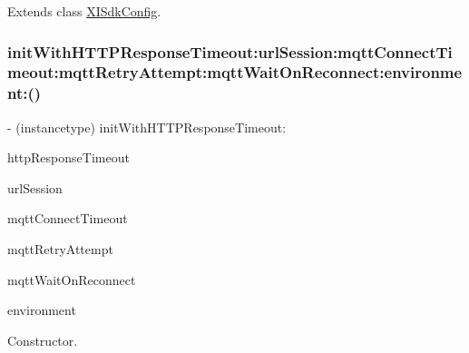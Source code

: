 Extends class \hyperlink{class_x_i_sdk_config_aaf78fa6769fee2f17ba641609f112e55}{X\+I\+Sdk\+Config}.

\hypertarget{category_x_i_sdk_config_07_selector_08_aeceeeb80a520f874d9793485a70bd591}{}\label{category_x_i_sdk_config_07_selector_08_aeceeeb80a520f874d9793485a70bd591} 
\subsubsection{\texorpdfstring{init\+With\+H\+T\+T\+P\+Response\+Timeout\+:url\+Session\+:mqtt\+Connect\+Timeout\+:mqtt\+Retry\+Attempt\+:mqtt\+Wait\+On\+Reconnect\+:environment\+:()}{initWithHTTPResponseTimeout:urlSession:mqttConnectTimeout:mqttRetryAttempt:mqttWaitOnReconnect:environment:()}}
{\footnotesize\ttfamily -\/ (instancetype) init\+With\+H\+T\+T\+P\+Response\+Timeout\+: \begin{DoxyParamCaption}\item[{(long)}]{http\+Response\+Timeout }\item[{urlSession:(N\+S\+U\+R\+L\+Session $\ast$)}]{url\+Session }\item[{mqttConnectTimeout:(long)}]{mqtt\+Connect\+Timeout }\item[{mqttRetryAttempt:(int)}]{mqtt\+Retry\+Attempt }\item[{mqttWaitOnReconnect:(long)}]{mqtt\+Wait\+On\+Reconnect }\item[{environment:(X\+I\+Environment)}]{environment }\end{DoxyParamCaption}}



Constructor. 


